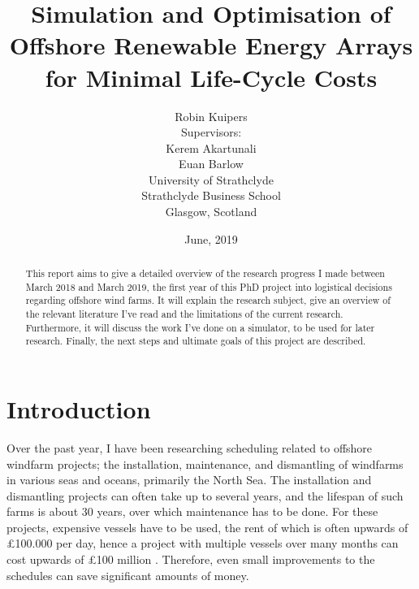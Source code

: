 \documentclass[a4paper,12pt]{article}
\begin{document}
\title{Simulation and Optimisation of Offshore Renewable Energy Arrays for Minimal Life-Cycle Costs}
\author{Robin Kuipers \\[1cm] Supervisors: \\ Kerem Akartunali \\ Euan Barlow\\[2cm] University of Strathclyde \\ Strathclyde Business School \\ {\small Glasgow, Scotland}}
\date{June, 2019}

\maketitle

\pagebreak

\begin{abstract}
This report aims to give a detailed overview of the research progress I made between March 2018 and March 2019, the first year of this PhD project into logistical decisions regarding offshore wind farms. It will explain the research subject, give an overview of the relevant literature I've read and the limitations of the current research. Furthermore, it will discuss the work I've done on a simulator, to be used for later research. Finally, the next steps and ultimate goals of this project are described. 
\end{abstract}

\pagebreak

\tableofcontents

\pagebreak

\section{Introduction} \label{s:intro}
Over the past year, I have been researching scheduling related to offshore windfarm projects; the installation, maintenance, and dismantling of windfarms in various seas and oceans, primarily the North Sea. The installation and dismantling projects can often take up to several years, and the lifespan of such farms is about 30 years, over which maintenance has to be done. For these projects, expensive vessels have to be used, the rent of which is often upwards of \pounds 100.000 per day\cite{barlow2014support}, hence a project with multiple vessels over many months can cost upwards of \pounds 100 million \cite{kaiser2010offshore}. Therefore, even small improvements to the schedules can save significant amounts of money.
\end{document}
